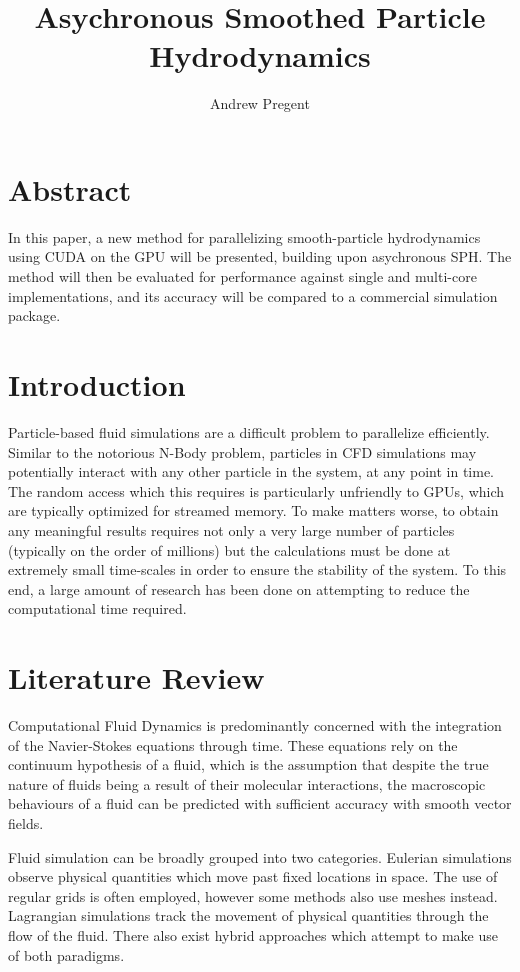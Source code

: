 \documentclass[format=acmtog,natbib=false]{acmart}
\title{Asychronous Smoothed Particle Hydrodynamics}
\author{Andrew Pregent}
\date{}
\begin{document}
\maketitle{}
\section{Abstract}

In this paper, a new method for parallelizing smooth-particle hydrodynamics using CUDA on the GPU will be presented, building upon asychronous SPH. The method will then be evaluated for performance against single and multi-core implementations, and its accuracy will be compared to a commercial simulation package.

\section{Introduction}

Particle-based fluid simulations are a difficult problem to parallelize efficiently. Similar to the notorious N-Body problem, particles in CFD simulations may potentially interact with any other particle in the system, at any point in time. The random access which this requires is particularly unfriendly to GPUs, which are typically optimized for streamed memory. To make matters worse, to obtain any meaningful results requires not only a very large number of particles (typically on the order of millions) but the calculations must be done at extremely small time-scales in order to ensure the stability of the system. To this end, a large amount of research has been done on attempting to reduce the computational time required.

\section{Literature Review}

Computational Fluid Dynamics is predominantly concerned with the integration of the Navier-Stokes equations through time. These equations rely on the continuum hypothesis of a fluid, which is the assumption that despite the true nature of fluids being a result of their molecular interactions, the macroscopic behaviours of a fluid can be  predicted with sufficient accuracy with smooth vector fields.

Fluid simulation can be broadly grouped into two categories. Eulerian simulations observe physical quantities which move past fixed locations in space. The use of regular grids is often employed, however some methods also use meshes instead. Lagrangian simulations track the movement of physical quantities through the flow of the fluid. There also exist hybrid approaches which attempt to make use of both paradigms.
\end{document}
